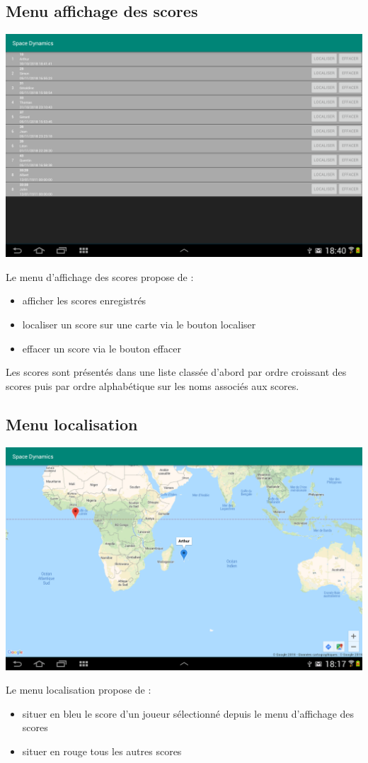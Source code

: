 \documentclass{article}
\begin{document}
\subsection{Menu affichage des scores}
\begin{center}
\includegraphics[scale=0.25]{ShowScoresActivity.png}
\end{center}
Le menu d'affichage des scores propose de :
\begin{itemize}
\item afficher les scores enregistrés
\item localiser un score sur une carte via le bouton localiser
\item effacer un score via le bouton effacer
\end{itemize}
Les scores sont présentés dans une liste classée d'abord par ordre croissant des scores puis par ordre alphabétique sur les noms associés aux scores.

\subsection{Menu localisation}
\begin{center}
\includegraphics[scale=0.25]{MapsActivity.png}
\end{center}
Le menu localisation propose de :
\begin{itemize}
\item situer en bleu le score d’un joueur sélectionné depuis le menu d’affichage des scores
\item situer en rouge tous les autres scores 
\end{itemize}
\end{document}
